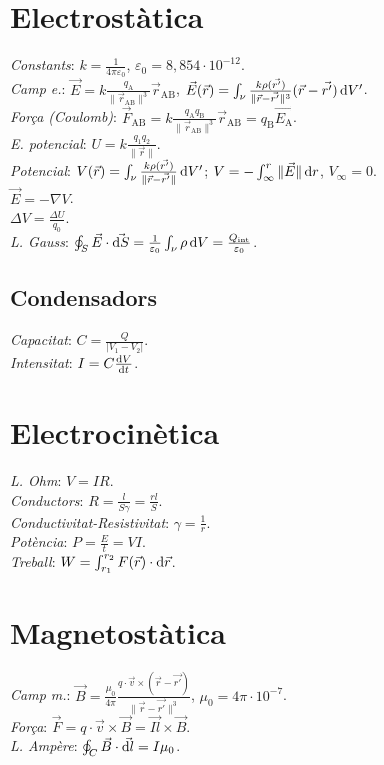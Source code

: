 \section{Electrostàtica}
\emph{Constants}: $k=\frac{1}{4\pi\varepsilon_0}$, $\varepsilon_0=8,854\cdot 10^{-12}$. \\
\emph{Camp e.}: $\vec{E} = k\frac{q_\text{A}}{\|\vec{r}_{\text{AB}}\|^3}\vec{r}_{\text{AB}}$, $\vec{E}(\vec{r}) = \int_\nu \frac{k\rho(\vec{r'})}{\|\vec{r}-\vec{r'}\|^3}(\vec{r}-\vec{r'}) \dif V'$. \\
\emph{Força (Coulomb)}: $\vec{F}_{\text{AB}} = k\frac{q_{\text{A}}q_{\text{B}}}{\|\vec{r}_{\text{AB}}\|^3}\vec{r}_{\text{AB}}=q_\text{B}\vec{E_\text{A}}$. \\
\emph{E. potencial}: $U = k\frac{q_1q_2}{\|\vec{r}\|}$. \\
\emph{Potencial}: $V(\vec{r}) = \int_\nu \frac{k\rho(\vec{r'})}{\|\vec{r}-\vec{r'}\|}\dif V'$; $V=-\int_{\infty}^r \|\vec{E}\| \dif r$, $V_{\infty}=0$. \\
\ci $\vec{E}=-\nabla V$. \\
\ci $\Delta V = \frac{\Delta U}{q_0}$. \\
\emph{L. Gauss}: $\oint_S \vec{E}\cdot \vec{\dif S} = \frac{1}{\varepsilon_0} \int_\nu \rho \dif V = \frac{Q_\text{int}}{\varepsilon_0}$.

\subsection{Condensadors}
\emph{Capacitat}: $C = \frac{Q}{|V_1-V_2|}$. \\
\emph{Intensitat}: $I=C\frac{\dif V}{\dif t}$.

\section{Electrocinètica}
\emph{L. Ohm}: $V=IR$. \\
\emph{Conductors}: $R = \frac{l}{S\gamma} = \frac{rl}{S}$. \\
\emph{Conductivitat-Resistivitat}: $\gamma = \frac{1}{r}$. \\
\emph{Potència}: $P=\frac{E}{t}=VI$. \\
\emph{Treball}: $W=\int_{r_1}^{r_2} F(\vec{r}) \cdot \dif \vec{r}$.

\section{Magnetostàtica}
\emph{Camp m.}: $\vec{B} = \frac{\mu_0}{4\pi}\frac{q\cdot \vec{v}\times (\vec{r} - \vec{r'})}{\|\vec{r} -\vec{r'}\|^3}$, $\mu_0=4\pi \cdot 10^{-7}$. \\
\emph{Força}: $\vec{F} = q \cdot\vec{v}\times\vec{B} = \vec{Il} \times \vec{B}$. \\
\emph{L. Ampère}: $\oint_C \vec{B}\cdot \vec{\dif l} = I \mu_0$.

